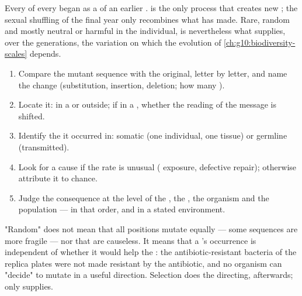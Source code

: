 \begin{proposition}\label{prop:g11:mutations:source}
Every  of every  began as a  of an earlier .
 is the only process that creates new ;
the sexual shuffling of the final year only recombines what 
has made. Rare, random and mostly neutral or harmful in the
individual,  is nevertheless what supplies, over the
generations, the variation on which the evolution of
\cref{ch:g10:biodiversity-scales} depends.
\end{proposition}
\admitted

\begin{method}\label{met:g11:mutations:analyse}
\begin{enumerate}
  \item Compare the mutant sequence with the original, letter by
        letter, and name the change (substitution, insertion,
        deletion; how many ).
  \item Locate it: in a  or outside; if in a , whether the
        reading of the message is shifted.
  \item Identify the  it occurred in: somatic (one individual, one
        tissue) or germline (transmitted).
  \item Look for a cause if the rate is unusual ( exposure,
        defective repair); otherwise attribute it to chance.
  \item Judge the consequence at the level of the , the ,
        the organism and the population --- in that order, and in a
        stated environment.
\end{enumerate}
\end{method}

\begin{remark}\label{rem:g11:mutations:random}
"Random" does not mean that all positions mutate equally --- some
sequences are more fragile --- nor that  are causeless. It
means that a 's occurrence is independent of whether it would
help the : the antibiotic-resistant bacteria of the replica plates
were not made resistant by the antibiotic, and no organism can
"decide" to mutate in a useful direction. Selection does the
directing, afterwards;  only supplies.
\end{remark}

